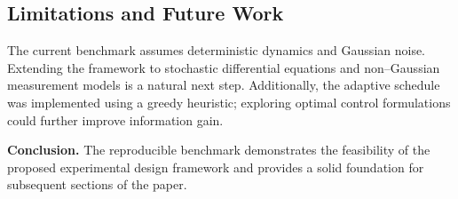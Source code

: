 \subsection{Limitations and Future Work}
\label{sec:10-limitations}
The current benchmark assumes deterministic dynamics and Gaussian noise.  Extending the framework to stochastic differential equations and non--Gaussian measurement models is a natural next step.  Additionally, the adaptive schedule was implemented using a greedy heuristic; exploring optimal control formulations could further improve information gain.

\bigskip
\noindent \textbf{Conclusion.}  The reproducible benchmark demonstrates the feasibility of the proposed experimental design framework and provides a solid foundation for subsequent sections of the paper.